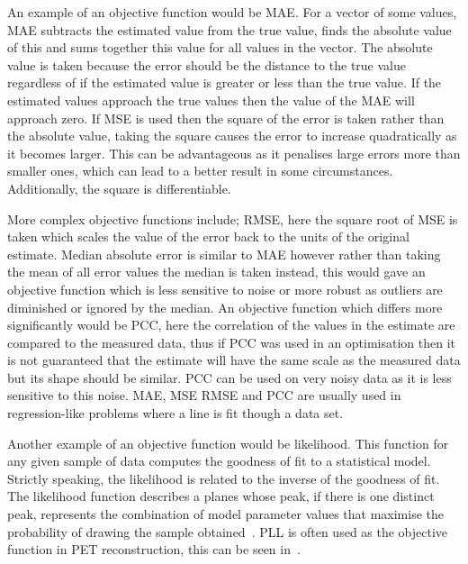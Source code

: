                 An example of an objective function would be \gls{MAE}. For a vector of some values, \gls{MAE} subtracts the estimated value from the true value, finds the absolute value of this and sums together this value for all values in the vector. The absolute value is taken because the error should be the distance to the true value regardless of if the estimated value is greater or less than the true value. If the estimated values approach the true values then the value of the \gls{MAE} will approach zero. If \gls{MSE} is used then the square of the error is taken rather than the absolute value, taking the square causes the error to increase quadratically as it becomes larger. %
                This can be advantageous as it penalises large errors more than smaller ones, which can lead to a better result in some circumstances. Additionally, the square is differentiable.
                
                More complex objective functions include; \gls{RMSE}, here the square root of \gls{MSE} is taken which scales the value of the error back to the units of the original estimate. Median absolute error is similar to \gls{MAE} however rather than taking the mean of all error values the median is taken instead, this would gave an objective function which is less sensitive to noise or more robust as outliers are diminished or ignored by the median. An objective function which differs more significantly would be \gls{PCC}, here the correlation of the values in the estimate are compared to the measured data, thus if \gls{PCC} was used in an optimisation then it is not guaranteed that the estimate will have the same scale as the measured data but its shape should be similar. \gls{PCC} can be used on very noisy data as it is less sensitive to this noise. \gls{MAE}, \gls{MSE} \gls{RMSE} and \gls{PCC} are usually used in regression-like problems where a line is fit though a data set.
                
                Another example of an objective function would be likelihood. This function for any given sample of data computes the goodness of fit to a statistical model. Strictly speaking, the likelihood is related to the inverse of the goodness of fit. %
                The likelihood function describes a planes whose peak, if there is one distinct peak, %
                represents the combination of model parameter values that maximise the probability of drawing the sample obtained~. %
                \gls{PLL} is often used as the objective function in \gls{PET} reconstruction, this can be seen in~.
                
